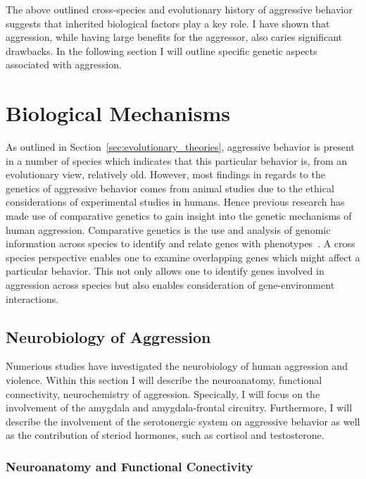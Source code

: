 The above outlined cross-species and evolutionary history of aggressive behavior suggests that inherited biological factors play a key role.
I have shown that aggression, while having large benefits for the aggressor, also caries significant drawbacks.
In the following section I will outline specific genetic aspects associated with aggression.


\section{Biological Mechanisms}
\label{sec:biological_mechanisms}

As outlined in Section~\ref{sec:evolutionary_theories}, aggressive behavior is present in a number of species which indicates that this particular behavior is, from an evolutionary view, relatively old.
However, most findings in regards to the genetics of aggressive behavior comes from animal studies due to the ethical considerations of experimental studies in humans.
Hence previous research has made use of comparative genetics to gain insight into the genetic mechanisms of human aggression.
Comparative genetics is the use and analysis of genomic information across species to identify and relate genes with phenotypes~\cite{Maxson2003}.
A cross species perspective enables one to examine overlapping genes which might affect a particular behavior.
This not only allows one to identify genes involved in aggression across species but also enables consideration of gene-environment interactions.

\subsection{Neurobiology of Aggression}
\label{sub:neurobiology_of_aggression}

Numerious studies have investigated the neurobiology of human aggression and violence.
Within this section I will describe the neuroanatomy, functional connectivity, neurochemistry of aggression. 
Specically, I will focus on the involvement of the amygdala and amygdala-frontal circuitry. 
Furthermore, I will describe the involvement of the serotonergic system on aggressive behavior as well as the contribution of steriod hormones, such as cortisol and testosterone.

\subsubsection{Neuroanatomy and Functional Conectivity}
\label{ssub:neuroanatomy_and_functional_conectivity}

